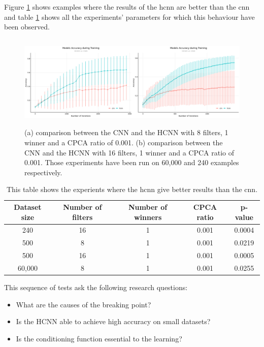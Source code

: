 \documentclass[11pt]{report}
\begin{document}
\noindent Figure \ref{fig:hcnn_better} shows examples where the results of the \acrshort{hcnn} are better than the \acrshort{cnn} and table \ref{table:hcnn_better} shows all the experiments' parameters for which this behaviour have been observed.

\begin{figure}[h]
\centering
\includegraphics[width=12cm, height=4.5cm]{hcnn_better}
\caption[Illustration of two experiments where the HCNN is better than the CNN.]{(a) comparison between the CNN and the HCNN with 8 filters, 1 winner and a CPCA ratio of 0.001. (b) comparison between the CNN and the HCNN with 16 filters, 1 winner and a CPCA ratio of 0.001. Those experiments have been run on 60,000 and 240 examples respectively.}
\label{fig:hcnn_better}
\end{figure}

\begin{table}[h!]
\centering
\begin{tabular}{ c c c c c }
Dataset size & Number of filters & Number of winners & CPCA ratio & p-value\\
\hline
240 & 16 & 1 & 0.001 & 0.0004\\
500 & 8 & 1 & 0.001 & 0.0219\\
500 & 16 & 1 & 0.001 & 0.0005\\
60,000 & 8 & 1 & 0.001 & 0.0255
\end{tabular}
\caption[Benchmark where the \acrshort{hcnn} is better than the \acrshort{cnn}.]{This table shows the experients where the \acrshort{hcnn} give better results than the \acrshort{cnn}.}
\label{table:hcnn_better}
\end{table}
\newpage

\noindent This sequence of tests ask the following research questions:

\begin{itemize}
	\item What are the causes of the breaking point?
	\item Is the HCNN able to achieve high accuracy on small datasets?
	\item Is the conditioning function essential to the learning?
\end{itemize}
\newpage
\end{document}

